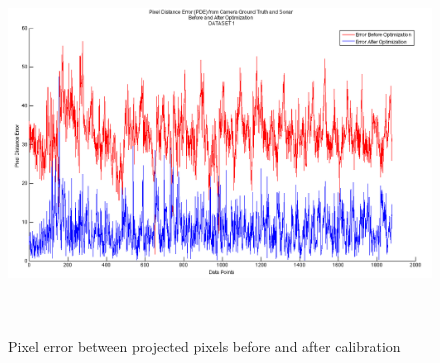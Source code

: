 \documentclass[a4paper]{IEEEtran}
\begin{document}
\begin{figure}
  \includegraphics[width=\textwidth,height=10cm]{5}
  \caption{Pixel error between projected pixels before and after calibration}
\end{figure}
\end{document}
